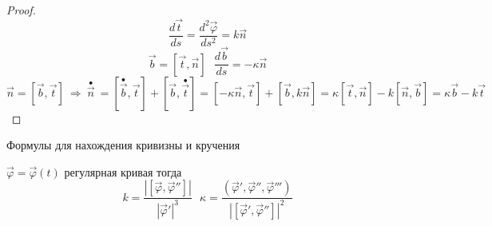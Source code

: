 \begin{proof}
  $$
  \frac{d\vec t}{ds} = \frac{d^2 \vec \varphi}{ds^2} = k \vec n
  $$
  $$
  \vec b = [\vec t, \vec n] ~~~ \frac{d\vec b}{ds} = - \kappa \vec n
  $$
  $$
  \vec n = [\vec b, \vec t] ~ \Rightarrow ~ \stackrel{\bullet}{\vec n}~ =
  [\stackrel{\bullet}{\vec b}, \vec t] + [\vec b, \stackrel{\bullet}{\vec t}]
  = [-\kappa \vec n, \vec t] + [\vec b, k \vec n] =
  \kappa[\vec t, \vec n] - k[\vec n, \vec b] =
  \kappa \vec b - k \vec t
  $$
\end{proof}

\begin{title}[\Large]
  Формулы для нахождения кривизны и кручения
\end{title}

\begin{block}
  $\vec \varphi = \vec \varphi(t)$ регулярная кривая тогда
  $$
  k = \frac{|[\vec \varphi, \vec \varphi'']|}{|\vec \varphi'|^3} ~~~
  \kappa = \frac{( \vec \varphi', \vec \varphi'', \vec \varphi''')}
  {|[\vec \varphi', \vec \varphi'']|^2}
  $$
\end{block}


